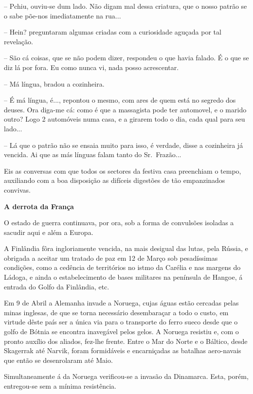 \documentclass[9pt]{article}
\begin{document}
-- Pchiu, ouviu-se dum lado. Não digam mal dessa criatura, que o nosso
patrão se o sabe põe-nos imediatamente na rua...

-- Hein? preguntaram algumas criadas com a curiosidade aguçada por
tal revela\-ção.

-- São cá coisas, que se não podem dizer, respondeu o que havia falado.
É o que se diz lá por fora. Eu como nunca vi, nada posso acrescentar.

-- Má língua, bradou a cozinheira.

-- É má língua, é..., repontou o mesmo, com ares de quem está no segredo dos deuses. Ora diga-me cá: como é que a massagista pode ter automovel, e o marido outro? Logo 2 automóveis numa casa, e a girarem todo o
dia, cada qual para seu lado...

-- Lá que o patrão não se ensaia muito para isso, é verdade, disse a
cozinheira já vencida. Ai que as más línguas falam tanto do Sr.\ Frazão...

Eis as conversas com que todos os sectores da festiva casa preenchiam o tempo, auxiliando com a boa disposi\-ção as difíceis digestões de
tão empanzinados convivas.

\begin{center}\bf\large A derrota da Fran\-ça\end{center}

O estado de guerra continuava, por ora, sob a forma de convulsões
isoladas a sacudir aqui e além a Europa.

A Finlândia fôra ingloriamente vencida, na mais desigual das lutas,
pela Rússia, e obrigada a aceitar um tratado de paz em 12 de Março sob
pesadíssimas condi\-ções, como a cedên\-cia de territórios no istmo da Carélia
e nas margens do Ládoga, e ainda o estabelecimento de bases militares na
península de Hangoe, á entrada do Golfo da Finlândia, etc.

Em 9 de Abril a Alemanha invade a Noruega, cujas águas estão cercadas
pelas minas inglesas, de que se torna necessário desembaraçar a
todo o custo, em virtude dêste país ser a única via para o transporte do
ferro sueco desde que o golfo de Bótnia se encontra inavegável pelos gelos. A Noruega resistiu e, com o pronto auxílio dos aliados,
fez-\-lhe frente. Entre o Mar do Norte e o Báltico, desde Skagerrak até
Narvik, foram formidáveis e encarniçadas as bata\-lhas aero-navais que então se desenrolaram até Maio.

Simultaneamente á da Noruega verificou-se a invasão da Dinamarca.
Esta, porém, entregou-se sem a mínima resistência.
\end{document}
